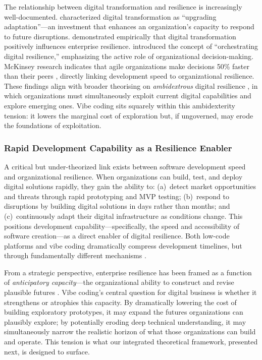 \documentclass[preprint,12pt,authoryear]{elsarticle}
\begin{document}
The relationship between digital transformation and resilience is increasingly well-documented. \citet{Browder2024} characterized digital transformation as ``upgrading adaptation''---an investment that enhances an organization's capacity to respond to future disruptions. \citet{Li2024} demonstrated empirically that digital transformation positively influences enterprise resilience. \citet{Breidbach2024} introduced the concept of ``orchestrating digital resilience,'' emphasizing the active role of organizational decision-making. McKinsey research indicates that agile organizations make decisions 50\% faster than their peers \citep{McKinsey2023agility}, directly linking development speed to organizational resilience. These findings align with broader theorising on \emph{ambidextrous} digital resilience \citep{Boh2022}, in which organizations must simultaneously exploit current digital capabilities and explore emerging ones. Vibe coding sits squarely within this ambidexterity tension: it lowers the marginal cost of exploration but, if ungoverned, may erode the foundations of exploitation.

\subsubsection{Rapid Development Capability as a Resilience Enabler}

A critical but under-theorized link exists between software development speed and organizational resilience. When organizations can build, test, and deploy digital solutions rapidly, they gain the ability to: (a)~detect market opportunities and threats through rapid prototyping and MVP testing; (b)~respond to disruptions by building digital solutions in days rather than months; and (c)~continuously adapt their digital infrastructure as conditions change. This positions development capability---specifically, the speed and accessibility of software creation---as a direct enabler of digital resilience. Both low-code platforms and vibe coding dramatically compress development timelines, but through fundamentally different mechanisms \citep{Sanchis2020, Fawzy2025}.

From a strategic perspective, enterprise resilience has been framed as a function of \emph{anticipatory capacity}---the organizational ability to construct and revise plausible futures \citep{Rohrbeck2018}. Vibe coding's central question for digital business is whether it strengthens or atrophies this capacity. By dramatically lowering the cost of building exploratory prototypes, it may expand the futures organizations can plausibly explore; by potentially eroding deep technical understanding, it may simultaneously narrow the realistic horizon of what those organizations can build and operate. This tension is what our integrated theoretical framework, presented next, is designed to surface.
\end{document}
